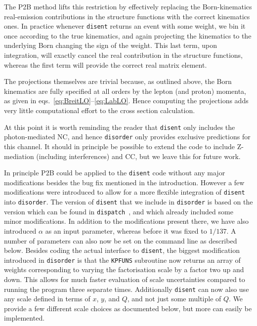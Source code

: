 \documentclass[submission, PhysCodeb]{SciPost}
\newcommand{\disent}{{\tt disent}}
\newcommand{\disorder}{{\tt disorder}}
\begin{document}
The P2B method lifts this restriction by effectively replacing the
Born-kinematics real-emission contributions in the structure functions
with the correct kinematics ones. In practice whenever \disent{}
returns an event with some weight, we bin it once according to the
true kinematics, and again projecting the kinematics to the underlying
Born changing the sign of the weight. This last term, upon integration,
will exactly cancel the real contribution in the structure functions,
whereas the first term will provide the correct real matrix element.

The projections themselves are trivial because, as outlined above, the
Born kinematics are fully specified at all orders by the lepton (and
proton) momenta, as given in
eqs.~\eqref{eq:BreitLO}--\eqref{eq:LabLO}. Hence computing the
projections adds very little computational effort to the cross section
calculation.

At this point it is worth reminding the reader that \disent{} only
includes the photon-mediated NC, and hence \disorder{} only provides
exclusive predictions for this channel. It should in principle be
possible to extend the code to include Z-mediation (including
interferences) and CC, but we leave this for future work.

In principle P2B could be applied to the \disent{} code without any
major modifications besides the bug fix mentioned in the
introduction. However a few modifications were introduced to allow for
a more flexible integration of \disent{} into \disorder{}. The version
of \disent{} that we include in \disorder{} is based on the version
which can be found in {\tt dispatch}~\cite{Dasgupta:2002dc}, and which
already included some minor modifications. In addition to the
modifications present there, we have also introduced $\alpha$ as an
input parameter, whereas before it was fixed to $1/137$. A number of
parameters can also now be set on the command line as described
below. Besides coding the actual interface to \disent{}, the biggest
modification introduced in \disorder{} is that the {\tt KPFUNS}
subroutine now returns an array of weights corresponding to varying
the factorisation scale by a factor two up and down. This allows for
much faster evaluation of scale uncertainties compared to running the
program three separate times. Additionally \disent{} can now also use
any scale defined in terms of $x$, $y$, and $Q$, and not just some
multiple of $Q$. We provide a few different scale choices as
documented below, but more can easily be implemented.
\end{document}

